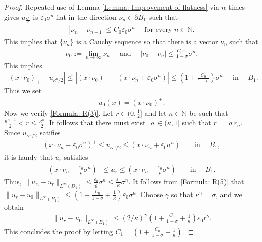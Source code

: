 \documentclass[11pt,reqno]{amsart}
\begin{document}
\begin{proof}
	Repeated use of Lemma \ref{Lemma: Improvement of flatness} via $n$ times gives $u_{\frac{\kappa^{n}}{2}}$ is $\varepsilon_{0}\sigma^{n}$-flat in the direction $\nu_{n}\in\partial B_{1}$ such that
	\begin{align*}
		|\nu_{n}-\nu_{n+1}|\leqslant C_{0}\varepsilon_{0}\sigma^{n}\quad\text{ for every }n\in\mathbb{N}.
	\end{align*}
	This implies that $\{\nu_{n}\}$ is a Cauchy sequence so that there is a vector $\nu_{0}$ such that
	\begin{align*}
		\nu_{0}:=\lim_{n\to\infty}\nu_{n}\quad\text{ and }\quad|\nu_{0}-\nu_{n}|\leqslant\frac{C_{0}\varepsilon_{0}}{1-\sigma}\sigma^{n}.
	\end{align*}
	This implies
	\begin{align}\label{Formula: R(5)}
		|(x\cdot\nu_{0})_{+}-u_{\kappa^{n}/2}|\leqslant|(x\cdot\nu_{0})_{+}-(x\cdot\nu_{n}+\varepsilon_{0}\sigma^{n})|\leqslant\left(1+\frac{C_{0}}{1-\sigma}\right)\sigma^{n}\quad\text{ in }\quad B_{1}.
	\end{align}
	Thus we set
	\begin{align*}
		u_{0}(x)=(x\cdot\nu_{0})^{+}.
	\end{align*}
	Now we verify \eqref{Formula: R(3)}. Let $r\in(0,\tfrac{1}{2}]$ and let $n\in\mathbb{N}$ be such that $\tfrac{\kappa^{n+1}}{2}<r\leqslant\frac{\kappa^{n}}{2}$. It follows that there must exist $\varrho\in(\kappa,1]$ such that $r=\varrho r_{n}$. Since $u_{\kappa^{n}/2}$ satifies
	\begin{align*}
		(x\cdot\nu_{n}-\varepsilon_{0}\sigma^{n})^{+}\leqslant u_{\kappa^{n}/2}\leqslant(x\cdot\nu_{n}+\varepsilon_{0}\sigma^{n})^{+}\quad\text{ in }\quad B_{1},
	\end{align*}
	it is handy that $u_{r}$ satisfies
	\begin{align*}
		\left(x\cdot\nu_{n}-\frac{\varepsilon_{0}}{\varrho}\sigma^{n}\right)^{+}\leqslant u_{r}\leqslant\left(x\cdot\nu_{n}+\frac{\varepsilon_{0}}{\varrho}\sigma^{n}\right)^{+}\quad\text{ in }\quad B_{1}.
	\end{align*}
	Thus, $\|u_{n}-u_{r}\|_{L^{\infty}(B_{1})}\leqslant\frac{\varepsilon_{0}}{\varrho}\sigma^{n}\leqslant\frac{\varepsilon_{0}}{\kappa}\sigma^{n}$. It follows from  \eqref{Formula: R(5)} that $\|u_{r}-u_{0}\|_{L^{\infty}(B_{1})}\leqslant(1+\frac{C_{0}}{1-\sigma}+\frac{1}{\kappa})\varepsilon_{0}\sigma^{n}$. Choose $\gamma$ so that $\kappa^{\gamma}=\sigma$, and we obtain
	\begin{align*}
		\|u_{r}-u_{0}\|_{L^{\infty}(B_{1})}\leqslant(2/\kappa)^{\gamma}\left(1+\frac{C_{0}}{1-\sigma}+\frac{1}{\kappa}\right)\varepsilon_{0}r^{\gamma}.
	\end{align*}
	This concludes the proof by letting $C_{1}=\left(1+\frac{C_{0}}{1-\sigma}+\frac{1}{\kappa}\right)$.
\end{proof}
\end{document}
